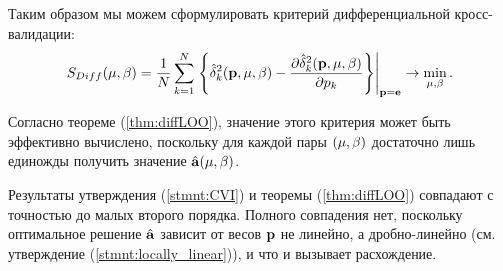 Таким образом мы можем сформулировать критерий дифференциальной кросс-валидации:
\begin{equation*}
	S_{Diff}({\mu,\beta}) 
	= \frac1N\sum\limits_{k=1}^N \left. \left\{
		\hat{\delta}_k^2(\boldsymbol{\mathbf{p}}, {\mu,\beta})
		- \frac{\partial\hat{\delta}_k^2(\boldsymbol{\mathbf{p}}, {\mu,\beta})}{\partial p_k} 
	\right\}\right|_{\boldsymbol{\mathbf{p}}=\boldsymbol{\mathbf{e}}} \to \mathop{\mbox{min}}\limits_{{\mu,\beta}}.
\end{equation*}

Согласно теореме (\ref{thm:diffLOO}), значение этого критерия может быть эффективно вычислено, поскольку для каждой пары $({\mu,\beta})$ достаточно лишь единожды получить значение $\hat{\boldsymbol{\mathbf{a}}}({\mu,\beta})$.

Результаты утверждения (\ref{stmnt:CVI}) и теоремы (\ref{thm:diffLOO}) совпадают с точностью до малых второго порядка. Полного совпадения нет, поскольку оптимальное решение $\hat{\boldsymbol{\mathbf{a}}}$ зависит от весов $\boldsymbol{\mathbf{p}}$ не линейно, а дробно-линейно (см. утверждение (\ref{stmnt:locally_linear})), и что и вызывает расхождение.